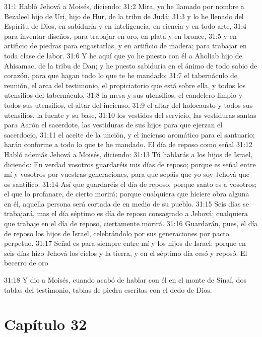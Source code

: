 31:1 Habló Jehová a Moisés, diciendo: 
31:2 Mira, yo he llamado por nombre a Bezaleel hijo de Uri, hijo de Hur, de la tribu de Judá; 
31:3 y lo he llenado del Espíritu de Dios, en sabiduría y en inteligencia, en ciencia y en todo arte, 
31:4 para inventar diseños, para trabajar en oro, en plata y en bronce, 
31:5 y en artificio de piedras para engastarlas, y en artificio de madera; para trabajar en toda clase de labor. 
31:6 Y he aquí que yo he puesto con él a Aholiab hijo de Ahisamac, de la tribu de Dan; y he puesto sabiduría en el ánimo de todo sabio de corazón, para que hagan todo lo que te he mandado; 
31:7 el tabernáculo de reunión, el arca del testimonio, el propiciatorio que está sobre ella, y todos los utensilios del tabernáculo, 
31:8 la mesa y sus utensilios, el candelero limpio y todos sus utensilios, el altar del incienso, 
31:9 el altar del holocausto y todos sus utensilios, la fuente y su base, 
31:10 los vestidos del servicio, las vestiduras santas para Aarón el sacerdote, las vestiduras de sus hijos para que ejerzan el sacerdocio, 
31:11 el aceite de la unción, y el incienso aromático para el santuario; harán conforme a todo lo que te he mandado. 
El día de reposo como señal 
31:12 Habló además Jehová a Moisés, diciendo: 
31:13 Tú hablarás a los hijos de Israel, diciendo: En verdad vosotros guardaréis mis días de reposo; porque es señal entre mí y vosotros por vuestras generaciones, para que sepáis que yo soy Jehová que os santifico. 
31:14 Así que guardaréis el día de reposo, porque santo es a vosotros; el que lo profanare, de cierto morirá; porque cualquiera que hiciere obra alguna en él, aquella persona será cortada de en medio de su pueblo. 
31:15 Seis días se trabajará, mas el día séptimo es día de reposo consagrado a Jehová; cualquiera que trabaje en el día de reposo, ciertamente morirá. 
31:16 Guardarán, pues, el día de reposo los hijos de Israel, celebrándolo por sus generaciones por pacto perpetuo. 
31:17 Señal es para siempre entre mí y los hijos de Israel; porque en seis días hizo Jehová los cielos y la tierra, y en el séptimo día cesó y reposó. 
El becerro de oro 

31:18 Y dio a Moisés, cuando acabó de hablar con él en el monte de Sinaí, dos tablas del testimonio, tablas de piedra escritas con el dedo de Dios. 
\section*{Capítulo 32}

